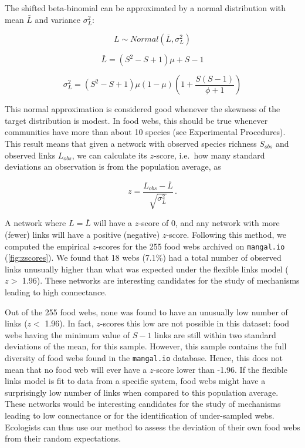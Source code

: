 \documentclass[12pt]{article}
\begin{document}
The shifted beta-binomial can be approximated by a normal distribution
with mean \(\bar{L}\) and variance \(\sigma_L^2\):

\[L \sim Normal(\bar{L}, \sigma_L^2)\]

\[\bar{L} = (S^2 - S + 1) \mu + S - 1\]

\begin{equation}\sigma_L^2 = (S^2 - S + 1) \mu (1 - \mu)(1 + \frac{S(S-1)}{\phi + 1})\label{eq:bb_sigma}\end{equation}

This normal approximation is considered good whenever the skewness of
the target distribution is modest. In food webs, this should be true
whenever communities have more than about 10 species (see Experimental
Procedures). This result means that given a network with observed
species richness \(S_{obs}\) and observed links \(L_{obs}\), we can
calculate its \(z\)-score, i.e.~how many standard deviations an
observation is from the population average, as

\begin{equation}z = \frac{L_{obs} - \bar{L}}{\sqrt{\sigma_L^2}} \,.\label{eq:z}\end{equation}

A network where \(L = \bar{L}\) will have a \(z\)-score of 0, and any
network with more (fewer) links will have a positive (negative)
\(z\)-score. Following this method, we computed the empirical
\(z\)-scores for the 255 food webs archived on \texttt{mangal.io}
(\cref{fig:zscores}). We found that 18 webs (7.1\%) had a total number
of observed links unusually higher than what was expected under the
flexible links model (\(z >\) 1.96). These networks are interesting
candidates for the study of mechanisms leading to high connectance.

Out of the 255 food webs, none was found to have an unusually low number
of links (\(z <\) 1.96). In fact, \(z\)-scores this low are not possible
in this dataset: food webs having the minimum value of \(S-1\) links are
still within two standard deviations of the mean, for this sample.
However, this sample contains the full diversity of food webs found in
the \texttt{mangal.io} database. Hence, this does not mean that no food
web will ever have a \(z\)-score lower than -1.96. If the flexible links
model is fit to data from a specific system, food webs might have a
surprisingly low number of links when compared to this population
average. These networks would be interesting candidates for the study of
mechanisms leading to low connectance or for the identification of
under-sampled webs. Ecologists can thus use our method to assess the
deviation of their own food webs from their random expectations.
\end{document}

